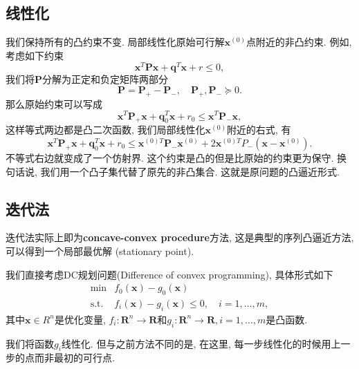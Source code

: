 \documentclass{article}
\begin{document}
\subsection{线性化}
我们保持所有的凸约束不变.
局部线性化原始可行解$\bm{x}^{(0)}$点附近的非凸约束.
例如, 考虑如下约束
\begin{equation}
\bm{x}^T \bm{P} \bm{x} + \bm{q}^T \bm{x} + r \leq 0,
\end{equation}
我们将$\bm{P}$分解为正定和负定矩阵两部分
\begin{equation}
\bm{P} = \bm{P}_{+} - \bm{P}_{-} , \quad \bm{P}_{+},\bm{P}_{-} \succeq 0.
\end{equation}
那么原始约束可以写成
\begin{equation}
\bm{x}^T \bm{P}_{+} \bm{x} + \bm{q}_0^T \bm{x} + r_0 \leq \bm{x}^T \bm{P}_{-} \bm{x},
\end{equation}
这样等式两边都是凸二次函数, 我们局部线性化$\bm{x}^{(0)}$附近的右式, 有
\begin{equation}
\bm{x}^T \bm{P}_{+} \bm{x} + \bm{q}_0^T \bm{x} + r_0 \leq \bm{x}^{(0)T} \bm{P}_{-} \bm{x}^{(0)} + 2\bm{x}^{(0)T} P_{-}(\bm{x}-\bm{x}^{(0)}).
\end{equation}
不等式右边就变成了一个仿射界. 
这个约束是凸的但是比原始的约束更为保守. 
换句话说, 我们用一个凸子集代替了原先的非凸集合. 
这就是原问题的凸逼近形式.

\subsection{迭代法}
迭代法实际上即为\textbf{concave-convex procedure}方法, 这是典型的序列凸逼近方法, 可以得到一个局部最优解 (stationary point).

我们直接考虑DC规划问题(Difference of convex programming), 具体形式如下
\begin{equation}
\begin{array}{cl}
{\min} & {f_0(\bm{x})-g_0(\bm{x})} \\
{\text{s.t.}} & {f_i(\bm{x})-g_i(\bm{x}) \leq 0, \quad i=1,\dots,m,}
\end{array}
\end{equation}
其中$\bm{x}\in R^n$是优化变量, $f_i:\bm{R}^n \rightarrow \bm{R}$和$g_i:\bm{R}^n \rightarrow \bm{R}, i=1,\dots,m$是凸函数.

我们将函数$g_i$线性化.
但与之前方法不同的是, 在这里, 每一步线性化的时候用上一步的点而非最初的可行点.
\end{document}
